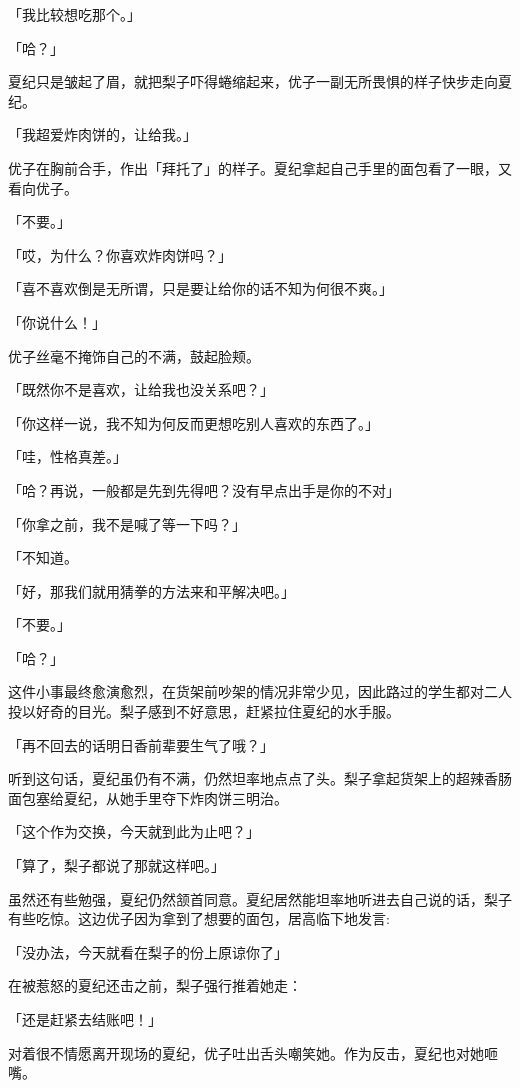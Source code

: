 \documentclass[UTF8]{ctexart}
\begin{document}
    「我比较想吃那个。」

    「哈？」

    夏纪只是皱起了眉，就把梨子吓得蜷缩起来，优子一副无所畏惧的样子快步走向夏纪。

    「我超爱炸肉饼的，让给我。」

    优子在胸前合手，作出「拜托了」的样子。夏纪拿起自己手里的面包看了一眼，又看向优子。

    「不要。」

    「哎，为什么？你喜欢炸肉饼吗？」

    「喜不喜欢倒是无所谓，只是要让给你的话不知为何很不爽。」

    「你说什么！」

    优子丝毫不掩饰自己的不满，鼓起脸颊。

    「既然你不是喜欢，让给我也没关系吧？」

    「你这样一说，我不知为何反而更想吃别人喜欢的东西了。」

    「哇，性格真差。」

    「哈？再说，一般都是先到先得吧？没有早点出手是你的不对」

    「你拿之前，我不是喊了等一下吗？」

    「不知道。

    「好，那我们就用猜拳的方法来和平解决吧。」

    「不要。」

    「哈？」

    这件小事最终愈演愈烈，在货架前吵架的情况非常少见，因此路过的学生都对二人投以好奇的目光。梨子感到不好意思，赶紧拉住夏纪的水手服。

    「再不回去的话明日香前辈要生气了哦？」

    听到这句话，夏纪虽仍有不满，仍然坦率地点点了头。梨子拿起货架上的超辣香肠面包塞给夏纪，从她手里夺下炸肉饼三明治。

    「这个作为交换，今天就到此为止吧？」

    「算了，梨子都说了那就这样吧。」

    虽然还有些勉强，夏纪仍然颔首同意。夏纪居然能坦率地听进去自己说的话，梨子有些吃惊。这边优子因为拿到了想要的面包，居高临下地发言:

    「没办法，今天就看在梨子的份上原谅你了」

    在被惹怒的夏纪还击之前，梨子强行推着她走：

    「还是赶紧去结账吧！」

    对着很不情愿离开现场的夏纪，优子吐出舌头嘲笑她。作为反击，夏纪也对她咂嘴。
\end{document}
